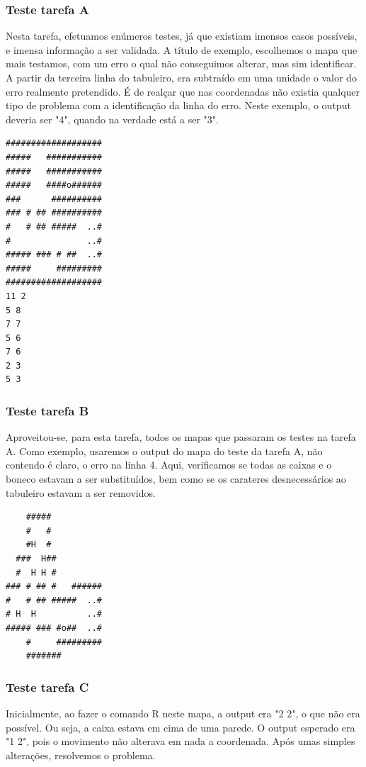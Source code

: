 \documentclass[a4paper]{article}
\begin{document}
\subsubsection{Teste tarefa A}

Nesta tarefa, efetuamos enúmeros testes, já que existiam imensos casos possíveis, e imensa informação a ser validada. A título de exemplo, escolhemos o mapa que mais testamos, com um erro o qual não conseguimos alterar, mas sim identificar. A partir da terceira linha do tabuleiro, era subtraído em uma unidade o valor do erro realmente pretendido. É de realçar que nas coordenadas não existia qualquer tipo de problema com a identificação da linha do erro. Neste exemplo, o output deveria ser "4", quando na verdade está a ser "3". \par


\begin{Verbatim}
###################
#####   ###########
#####   ###########
#####   ####o######
###      ##########
### # ## ##########
#   # ## #####  ..#
#               ..#
##### ### # ##  ..#
#####     #########
###################
11 2
5 8
7 7
5 6
7 6
2 3
5 3
\end{Verbatim}
\newpage

\subsubsection{Teste tarefa B}
Aproveitou-se, para esta tarefa, todos os mapas que passaram os testes na tarefa A. Como exemplo, usaremos o output do mapa do teste da tarefa A, não contendo é claro, o erro na linha 4. Aqui, verificamos se todas as caixas e o boneco estavam a ser substituídos, bem como se os carateres desnecessários ao tabuleiro estavam a ser removidos. \par

\begin{Verbatim}
    #####
    #   #
    #H  #
  ###  H##
  #  H H #
### # ## #   ######
#   # ## #####  ..#
# H  H          ..#
##### ### #o##  ..#
    #     #########
    #######

\end{Verbatim}

\subsubsection{Teste tarefa C}
Inicialmente, ao fazer o comando R neste mapa, a output era "2 2", o que não era possível. Ou seja, a caixa estava em cima de uma parede. O output esperado era "1 2", pois o movimento não alterava em nada a coordenada. Após umas simples alterações, resolvemos o problema. \par
\end{document}
